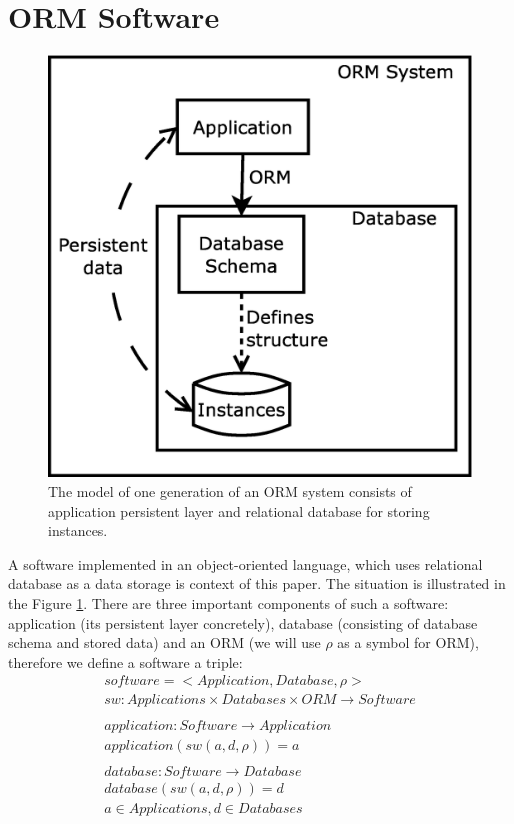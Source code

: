 \documentclass[11pt]{article}
\begin{document}
\section{ORM Software}
\label{sec:evoIntro}
\begin{figure}
\centering
	\includegraphics[scale=0.3]{./images/system}
	\caption{The model of one generation of an ORM system consists of application persistent layer and relational database for storing instances.}
\label{fig:appStructure}
\end{figure}
A software implemented in an object-oriented language, which uses relational database as a data storage is context of this paper. The situation is illustrated in the Figure \ref{fig:appStructure}. There are three important components of such a software: application (its persistent layer concretely), database (consisting of database schema and stored data) and an ORM (we will use $\rho$ as a symbol for ORM), therefore we define a software a triple:
\begin{gather*}
	software = < Application, Database, \rho > \\
	sw : Applications \times Databases \times ORM \rightarrow Software \\ \\
	application : Software \rightarrow Application \\
	application(sw(a, d, \rho)) = a \\ \\
	database : Software \rightarrow Database \\
	database(sw(a, d, \rho)) = d \\
	a \in Applications, d \in Databases
\end{gather*}
\end{document}
